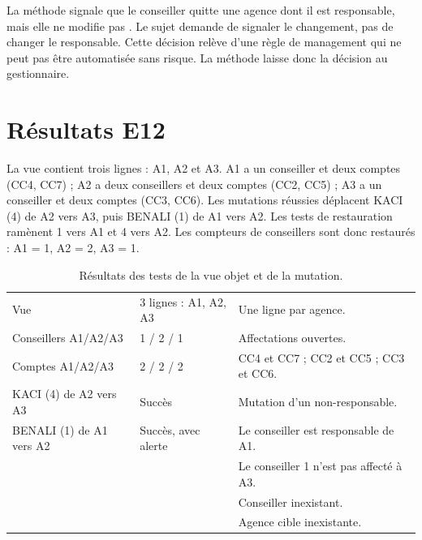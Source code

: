 \begin{clebox}
La méthode signale que le conseiller quitte une agence dont il est responsable,
mais elle ne modifie pas . Le sujet demande de
signaler le changement, pas de changer le responsable. Cette décision relève
d'une règle de management qui ne peut pas être automatisée sans risque. La
méthode laisse donc la décision au gestionnaire.
\end{clebox}

\section{Résultats E12}

La vue contient trois lignes : A1, A2 et A3. A1 a un conseiller et deux comptes
(CC4, CC7) ; A2 a deux conseillers et deux comptes (CC2, CC5) ; A3 a un
conseiller et deux comptes (CC3, CC6). Les mutations réussies déplacent KACI
(4) de A2 vers A3, puis BENALI (1) de A1 vers A2. Les tests de restauration
ramènent 1 vers A1 et 4 vers A2. Les compteurs de conseillers sont donc
restaurés : A1 = 1, A2 = 2, A3 = 1.

\begin{table}[htbp]
  \centering
  \small
  \caption{Résultats des tests de la vue objet et de la mutation.}
  \label{tab:resultats-e12}
  \begin{tabularx}{\textwidth}{@{}L{6.4cm}L{4.5cm}X@{}}
    \toprule
     &  &  \\
    \midrule
    Vue  & 3 lignes : A1, A2, A3 &
    Une ligne par agence. \\
    Conseillers A1/A2/A3 & 1 / 2 / 1 & Affectations ouvertes. \\
    Comptes A1/A2/A3 & 2 / 2 / 2 & CC4 et CC7 ; CC2 et CC5 ; CC3 et CC6. \\
    KACI (4) de A2 vers A3 & Succès & Mutation d'un non-responsable. \\
    BENALI (1) de A1 vers A2 & Succès, avec alerte &
    Le conseiller est responsable de A1. \\
     &  &
    Le conseiller 1 n'est pas affecté à A3. \\
     &  &
    Conseiller inexistant. \\
     &  &
    Agence cible inexistante. \\
    \bottomrule
  \end{tabularx}
\end{table}

